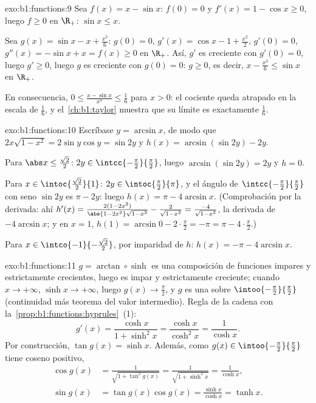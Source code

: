 \begin{solution}{exo:b1:functions:9}
Sea $f(x) = x - \sin x$: $f(0) = 0$ y $f'(x) = 1 - \cos x \geq 0$,
luego $f \geq 0$ en $\R_+$: $\sin x \leq x$.

Sea $g(x) = \sin x - x + \frac{x^3}{6}$: $g(0) = 0$,
$g'(x) = \cos x - 1 + \frac{x^2}{2}$, $g'(0) = 0$,
$g''(x) = -\sin x + x = f(x) \geq 0$ en $\R_+$. Así, $g'$ es creciente
con $g'(0) = 0$, luego $g' \geq 0$, luego $g$ es creciente con
$g(0) = 0$: $g \geq 0$, es decir, $x - \frac{x^3}{6} \leq \sin x$ en
$\R_+$.

En consecuencia, $0 \leq \frac{x - \sin x}{x^3} \leq \frac 16$ para
$x > 0$: el cociente queda atrapado en la escala de $\frac16$, y
el~\cref{ch:b1:taylor} muestra que su límite es exactamente $\frac 16$.
\end{solution}

\begin{solution}{exo:b1:functions:10}
Escríbase $y = \arcsin x$, de modo que $2x\sqrt{1 - x^2} = 2\sin y\cos y
= \sin 2y$ y $h(x) = \arcsin(\sin 2y) - 2y$.

Para $\abs x \leq \frac{\sqrt 2}{2}$: $2y \in
\intcc{-\frac\pi2}{\frac\pi2}$, luego $\arcsin(\sin 2y) = 2y$ y
$h = 0$.

Para $x \in \intoc{\frac{\sqrt 2}{2}}{1}$: $2y \in
\intoc{\frac\pi2}{\pi}$, y el ángulo de
$\intcc{-\frac\pi2}{\frac\pi2}$ con seno $\sin 2y$ es $\pi - 2y$:
luego $h(x) = \pi - 4\arcsin x$. (Comprobación por la derivada: ahí
$h'(x) = \frac{2(1 - 2x^2)}{\abs{1 - 2x^2}\sqrt{1 - x^2}} -
\frac{2}{\sqrt{1-x^2}} = \frac{-4}{\sqrt{1 - x^2}}$, la derivada de
$-4\arcsin x$; y en $x = 1$, $h(1) = \arcsin 0 - 2\cdot\frac\pi2
= -\pi = \pi - 4\cdot\frac\pi2$.)

Para $x \in \intco{-1}{-\frac{\sqrt 2}{2}}$, por imparidad de $h$:
$h(x) = -\pi - 4\arcsin x$.
\end{solution}

\begin{solution}{exo:b1:functions:11}
$g = \arctan \circ \sinh$ es una composición de funciones impares y
estrictamente crecientes, luego es impar y estrictamente creciente;
cuando $x \to +\infty$, $\sinh x \to +\infty$, luego
$g(x) \to \frac\pi2$, y $g$ es una  sobre
$\intoo{-\frac\pi2}{\frac\pi2}$ (continuidad más teorema del valor
intermedio). Regla de la cadena con
la~\cref{prop:b1:functions:hyprules}~(1):
\[
g'(x) = \frac{\cosh x}{1 + \sinh^2 x} = \frac{\cosh x}{\cosh^2 x}
= \frac{1}{\cosh x} .
\]
Por construcción, $\tan g(x) = \sinh x$. Además, como
$g(x) \in \intoo{-\frac\pi2}{\frac\pi2}$ tiene coseno positivo,
\begin{align*}
\cos g(x) &= \frac{1}{\sqrt{1 + \tan^2 g(x)}}
= \frac{1}{\sqrt{1 + \sinh^2 x}} = \frac{1}{\cosh x},\\
\sin g(x) &= \tan g(x) \cos g(x) = \frac{\sinh x}{\cosh x} = \tanh x .
\end{align*}
\end{solution}

